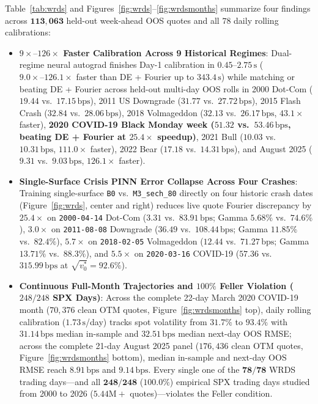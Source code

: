 \documentclass[11pt,a4paper]{article}
\begin{document}
Table~\ref{tab:wrds} and Figures~\ref{fig:wrds}--\ref{fig:wrdsmonths} summarize four findings across $\mathbf{113{,}063}$ held-out week-ahead OOS quotes and all $78$ daily rolling calibrations:
\begin{itemize}
  \item \textbf{$9\times\text{--}126\times$ Faster Calibration Across 9 Historical Regimes}: Dual-regime neural autograd finishes Day-1 calibration in $\mathbf{0.45\text{--}2.75\,\mathrm{s}}$ ($\mathbf{9.0\times\text{--}126.1\times}$ faster than DE + Fourier up to $343.4\,\mathrm{s}$) while matching or beating DE + Fourier across held-out multi-day OOS rolls in 2000 Dot-Com ($\mathbf{19.44}$ vs.\ $17.15\,\mathrm{bps}$), 2011 US Downgrade ($\mathbf{31.77}$ vs.\ $27.72\,\mathrm{bps}$), 2015 Flash Crash ($\mathbf{32.84}$ vs.\ $28.06\,\mathrm{bps}$), 2018 Volmageddon ($\mathbf{32.13}$ vs.\ $26.17\,\mathrm{bps}$, $43.1\times$ faster), \textbf{2020 COVID-19 Black Monday week ($\mathbf{51.32}$ vs.\ $53.46\,\mathrm{bps}$, beating DE + Fourier at $25.4\times$ speedup)}, 2021 Bull ($\mathbf{10.03}$ vs.\ $10.31\,\mathrm{bps}$, $111.0\times$ faster), 2022 Bear ($\mathbf{17.18}$ vs.\ $14.31\,\mathrm{bps}$), and August 2025 ($\mathbf{9.31}$ vs.\ $9.03\,\mathrm{bps}$, $126.1\times$ faster).
  \item \textbf{Single-Surface Crisis PINN Error Collapse Across Four Crashes}: Training single-surface \texttt{B0} vs.\ \texttt{M3\_sech\_80} directly on four historic crash dates (Figure~\ref{fig:wrds}, center and right) reduces live quote Fourier discrepancy by $\mathbf{25.4\times}$ on \texttt{2000-04-14} Dot-Com ($\mathbf{3.31}$ vs.\ $83.91\,\mathrm{bps}$; Gamma $\mathbf{5.68\%}$ vs.\ $74.6\%$), $\mathbf{3.0\times}$ on \texttt{2011-08-08} Downgrade ($\mathbf{36.49}$ vs.\ $108.44\,\mathrm{bps}$; Gamma $\mathbf{11.85\%}$ vs.\ $82.4\%$), $\mathbf{5.7\times}$ on \texttt{2018-02-05} Volmageddon ($\mathbf{12.44}$ vs.\ $71.27\,\mathrm{bps}$; Gamma $\mathbf{13.71\%}$ vs.\ $88.3\%$), and $\mathbf{5.5\times}$ on \texttt{2020-03-16} COVID-19 ($\mathbf{57.36}$ vs.\ $315.99\,\mathrm{bps}$ at $\sqrt{v_0^*} = 92.6\%$).
  \item \textbf{Continuous Full-Month Trajectories and $100\%$ Feller Violation ($248/248$ SPX Days)}: Across the complete 22-day March 2020 COVID-19 month ($70{,}376$ clean OTM quotes, Figure~\ref{fig:wrdsmonths} top), daily rolling calibration ($1.73\,\mathrm{s}$/day) tracks spot volatility from $31.7\%$ to $93.4\%$ with $\mathbf{31.14\,\mathrm{bps}}$ median in-sample and $\mathbf{32.51\,\mathrm{bps}}$ median next-day OOS RMSE; across the complete 21-day August 2025 panel ($176{,}436$ clean OTM quotes, Figure~\ref{fig:wrdsmonths} bottom), median in-sample and next-day OOS RMSE reach $\mathbf{8.91\,\mathrm{bps}}$ and $\mathbf{9.14\,\mathrm{bps}}$. Every single one of the $\mathbf{78/78}$ WRDS trading days---and all $\mathbf{248/248}$ ($\mathbf{100.0\%}$) empirical SPX trading days studied from 2000 to 2026 ($5.44\text{M}+$ quotes)---violates the Feller condition.
\end{itemize}
\end{document}
